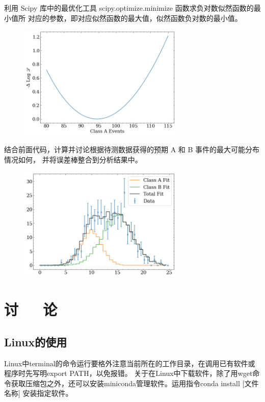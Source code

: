 \documentclass[10pt,a4paper,twoside,UTF8]{ctexart}
\begin{document}
利用 Scipy 库中的最优化工具 scipy.optimize.minimize 函数求负对数似然函数的最小值所
对应的参数，即对应似然函数的最大值，似然函数负对数的最小值。
\begin{figure}[H]
	\centering
	\includegraphics[width=0.7\textwidth]{img//4.png}
	\label{fig:4}
\end{figure}
结合前面代码，计算并讨论根据待测数据获得的预期 A 和 B 事件的最大可能分布情况如何，
并将误差棒整合到分析结果中。
\begin{figure}[H]
	\centering
	\includegraphics[width=0.7\textwidth]{img//5.png}
	\label{fig:5}
\end{figure}

\section{讨~~~论}
\subsection{Linux的使用}
Linux中terminal的命令运行要格外注意当前所在的工作目录，在调用已有软件或程序时先写明export PATH，以免报错。
关于在Linux中下载软件，除了用wget命令获取压缩包之外，还可以安装miniconda管理软件。运用指令conda install [文件名称] 安装指定软件。
\end{document}

